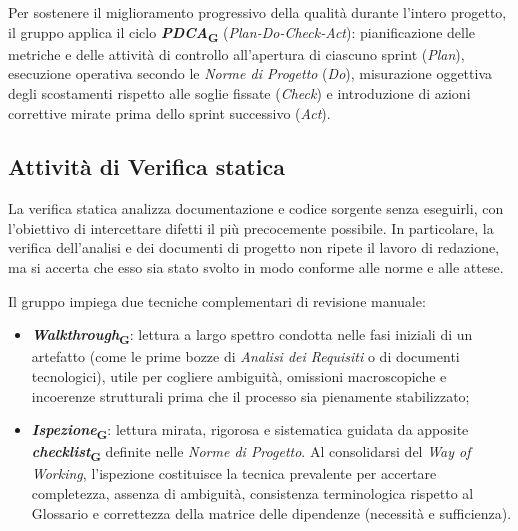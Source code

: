 \documentclass[11pt, a4paper]{article}
\newcommand{\glossario}[1]{\textit{#1}\textsubscript{G}}
\begin{document}
Per sostenere il miglioramento progressivo della qualità durante l'intero progetto, il gruppo applica il ciclo \textbf{\glossario{PDCA}} (\textit{Plan-Do-Check-Act}): pianificazione delle metriche e delle attività di controllo all'apertura di ciascuno sprint (\textit{Plan}), esecuzione operativa secondo le \textit{Norme di Progetto} (\textit{Do}), misurazione oggettiva degli scostamenti rispetto alle soglie fissate (\textit{Check}) e introduzione di azioni correttive mirate prima dello sprint successivo (\textit{Act}).

\subsection{Attività di Verifica statica}
La verifica statica analizza documentazione e codice sorgente senza eseguirli, con l'obiettivo di intercettare difetti il più precocemente possibile. In particolare, la verifica dell'analisi e dei documenti di progetto non ripete il lavoro di redazione, ma si accerta che esso sia stato svolto in modo conforme alle norme e alle attese.

Il gruppo impiega due tecniche complementari di revisione manuale:
\begin{itemize}
    \item \textbf{\glossario{Walkthrough}}: lettura a largo spettro condotta nelle fasi iniziali di un artefatto (come le prime bozze di \textit{Analisi dei Requisiti} o di documenti tecnologici), utile per cogliere ambiguità, omissioni macroscopiche e incoerenze strutturali prima che il processo sia pienamente stabilizzato;
    \item \textbf{\glossario{Ispezione}}: lettura mirata, rigorosa e sistematica guidata da apposite \textbf{\glossario{checklist}} definite nelle \textit{Norme di Progetto}. Al consolidarsi del \textit{Way of Working}, l'ispezione costituisce la tecnica prevalente per accertare completezza, assenza di ambiguità, consistenza terminologica rispetto al Glossario e correttezza della matrice delle dipendenze (necessità e sufficienza).
\end{itemize}
\end{document}
